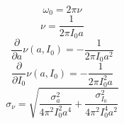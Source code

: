 \[\displaystyle \omega_{0} = 2 \pi \nu\]
\[\displaystyle \nu = \frac{1}{2 \pi I_{0} a}\]
\[\displaystyle \frac{\partial}{\partial a} \nu{\left(a,I_{0} \right)} = - \frac{1}{2 \pi I_{0} a^{2}}\]
\[\displaystyle \frac{\partial}{\partial I_{0}} \nu{\left(a,I_{0} \right)} = - \frac{1}{2 \pi I_{0}^{2} a}\]
\[\displaystyle \sigma_{\nu} = \sqrt{\frac{\sigma_{a}^{2}}{4 \pi^{2} I_{0}^{2} a^{4}} + \frac{\sigma_{I_{0}}^{2}}{4 \pi^{2} I_{0}^{4} a^{2}}}\]
